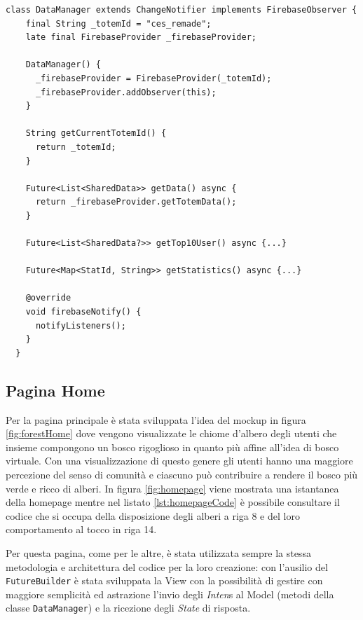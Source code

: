 \begin{lstlisting}[style=FlutterStyle, caption={Classe DataManager}, label={lst:dataManager}]
  class DataManager extends ChangeNotifier implements FirebaseObserver {
    final String _totemId = "ces_remade";
    late final FirebaseProvider _firebaseProvider;
  
    DataManager() {
      _firebaseProvider = FirebaseProvider(_totemId);
      _firebaseProvider.addObserver(this);
    }
  
    String getCurrentTotemId() {
      return _totemId;
    }
  
    Future<List<SharedData>> getData() async {
      return _firebaseProvider.getTotemData();
    }
  
    Future<List<SharedData?>> getTop10User() async {...}
  
    Future<Map<StatId, String>> getStatistics() async {...}
  
    @override
    void firebaseNotify() {
      notifyListeners(); 
    }
  }
\end{lstlisting}

\subsection{Pagina Home} 
Per la pagina principale è stata sviluppata l'idea del mockup in figura \ref{fig:forestHome} dove vengono visualizzate le chiome d'albero degli utenti che insieme compongono un bosco rigoglioso in quanto più affine all'idea di bosco virtuale. Con una visualizzazione di questo genere gli utenti hanno una maggiore percezione del senso di comunità e ciascuno può contribuire a rendere il bosco più verde e ricco di alberi. In figura \ref{fig:homepage} viene mostrata una istantanea della homepage mentre nel listato \ref{lst:homepageCode} è possibile consultare il codice che si occupa della disposizione degli alberi a riga 8 e del loro comportamento al tocco in riga 14.

Per questa pagina, come per le altre, è stata utilizzata sempre la stessa metodologia e architettura del codice per la loro creazione: con l'ausilio del \texttt{FutureBuilder} è stata sviluppata la View con la possibilità di gestire con maggiore semplicità ed astrazione l'invio degli \textit{Inten}s al Model (metodi della classe \texttt{DataManager}) e la ricezione degli \textit{State} di risposta.

